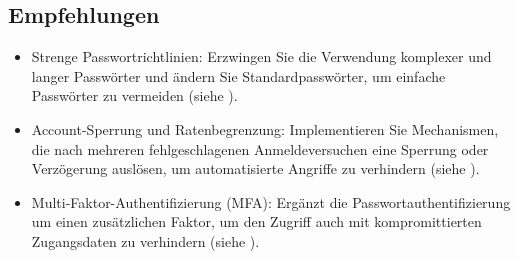\subsection*{Empfehlungen}
\begin{itemize}
    \item Strenge Passwortrichtlinien: Erzwingen Sie die Verwendung komplexer und langer Passwörter und ändern Sie Standardpasswörter, um einfache Passwörter zu vermeiden (siehe \cite{bsi_passwords}).
    \item Account-Sperrung und Ratenbegrenzung: Implementieren Sie Mechanismen, die nach mehreren fehlgeschlagenen Anmeldeversuchen eine Sperrung oder Verzögerung auslösen, um automatisierte Angriffe zu verhindern (siehe \cite{owaspAuthenticationOWASP}).
    \item Multi-Faktor-Authentifizierung (MFA): Ergänzt die Passwortauthentifizierung um einen zusätzlichen Faktor, um den Zugriff auch mit kompromittierten Zugangsdaten zu verhindern (siehe \cite{owaspAuthenticationOWASP}).
\end{itemize}
